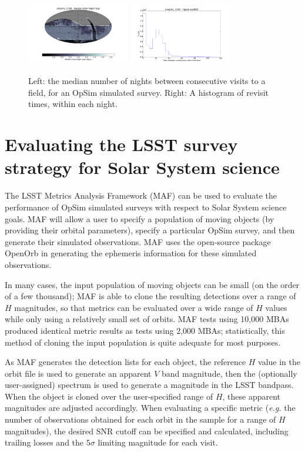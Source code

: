 \documentclass{iau}
\begin{document}
\begin{figure}[tb]
\centering
\includegraphics[width=0.4\textwidth]{internight}
\includegraphics[width=0.4\textwidth]{intranight}
\caption{Left: the median number of nights between consecutive
  visits to a field, for an OpSim simulated survey. Right: A histogram
  of revisit times, within each night.
\label{time}}
\end{figure}


\section{Evaluating the LSST survey strategy for Solar System science}

The LSST Metrics Analysis Framework (MAF) can be used to evaluate the
performance of OpSim simulated surveys with respect to Solar System
science goals. MAF will allow a user to specify a population of moving
objects (by providing their orbital parameters), specify a particular
OpSim survey, and then generate their simulated observations. MAF uses
the open-source package OpenOrb \cite{oorb} in generating the
ephemeris information for these simulated observations.

In many cases, the input population of moving objects can be
small (on the order of a few thousand); MAF is able to clone the resulting
detections over a range of $H$ magnitudes, so that 
metrics can be evaluated over a wide range of $H$ values while only
using a relatively small set of orbits. MAF tests using 10,000 MBAs
produced identical metric results as tests using 2,000 MBAs;
statistically, this method of cloning the input population is quite
adequate for most purposes.

As MAF generates the detection lists for each object, the reference
$H$ value in the orbit file is used to generate an apparent $V$ band
magnitude, then the (optionally user-assigned) spectrum is used to
generate a magnitude in the LSST bandpass. When the object is cloned
over the user-specified range of $H$, these apparent magnitudes are
adjusted accordingly. When evaluating a specific metric ({\it e.g.}
the number of observations obtained for each orbit in the sample for a
range of $H$ magnitudes), the desired SNR cutoff can be specified and
calculated, including trailing losses and the $5\sigma$ limiting magnitude for each visit.
\end{document}
